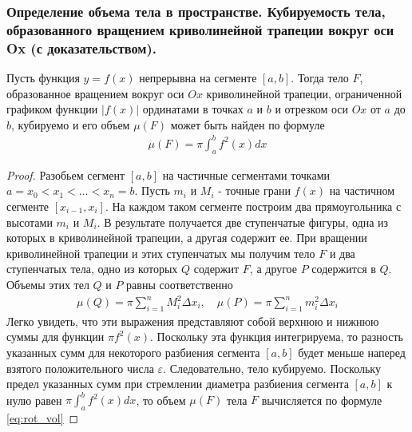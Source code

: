 \documentclass[10pt]{article}
\begin{document}
    \subsubsection{Определение объема тела в пространстве. Кубируемость тела, образованного вращением криволинейной трапеции вокруг оси Ox (с доказательством).}
    \begin{definition}
    \end{definition}
    \begin{corollary}
        Пусть функция $y = f(x)$ непрерывна на сегменте $[a, b]$. Тогда тело $F$, образованное вращением вокруг оси $Ox$ криволинейной трапеции, ограниченной графиком функции $|f(x)|$ ординатами в точках $a$ и $b$ и отрезком оси $Ox$ от $a$ до $b$, кубируемо и его объем $\mu(F)$ может быть найден по формуле
        \begin{gather}
            \mu(F) = \pi \int_{a}^{b} f^2(x) dx \label{eq:rot_vol}
        \end{gather}
    \end{corollary}
    \begin{proof}
        Разобьем сегмент $[a, b]$ на частичные сегментами точками $a = x_0 < x_1 < \ldots < x_n = b$. Пусть $m_i$ и $M_i$ - точные грани $f(x)$ на частичном сегменте $[x_{i-1}, x_i]$. На каждом таком сегменте построим два прямоугольника с высотами $m_i$ и $M_i$. В результате получается две ступенчатые фигуры, одна из которых в криволинейной трапеции, а другая содержит ее. При вращении криволинейной трапеции и этих ступенчатых мы получим тело $F$ и два ступенчатых тела, одно из которых $Q$ содержит $F$, а другое $P$ содержится в $Q$. Объемы этих тел $Q$ и $P$ равны соответственно
        \begin{gather*}
            \mu(Q) = \pi \sum_{i=1}^n M^2_i \Delta x_i,\quad \mu(P) = \pi \sum_{i=1}^n m^2_i \Delta x_i
        \end{gather*}
        Легко увидеть, что эти выражения представляют собой верхнюю и нижнюю суммы для функции $\pi f^2(x)$. Поскольку эта функция интегрируема, то разность указанных сумм для некоторого разбиения сегмента $[a, b]$ будет меньше наперед взятого положительного числа $\varepsilon$. Следовательно, тело кубируемо. Поскольку предел указанных сумм при стремлении диаметра разбиения сегмента $[a, b]$ к нулю равен $\pi \int_{a}^{b} f^2(x) dx$, то объем $\mu(F)$ тела $F$ вычисляется по формуле \ref{eq:rot_vol} 
    \end{proof}
\end{document}
